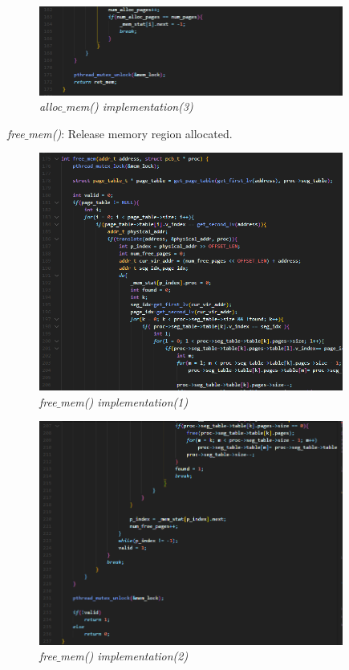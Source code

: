\documentclass[13pt,a4paper]{article}
\begin{document}
			\newpage
			\begin{figure}[h!]
				\begin{center}
					\includegraphics[width=10cm]{allocmem_3.png}
					\caption{\textit{alloc$\_$mem() implementation(3)}}
				\end{center}
			\end{figure} 
			\textit{free$\_$mem()}: Release memory region allocated.
			\begin{figure}[h!]
				\begin{center}
					\includegraphics[width=10cm]{freemem_1.png}
					\caption{\textit{free$\_$mem() implementation(1)}}
				\end{center}
			\end{figure}
			\begin{figure}[h!]
				\begin{center}
					\includegraphics[width=10cm]{freemem_2.png}
					\caption{\textit{free$\_$mem() implementation(2)}}
				\end{center}
			\end{figure}
\end{document}
